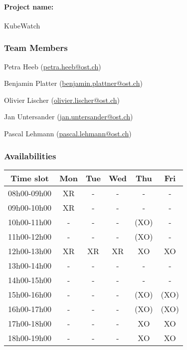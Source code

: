 

\paragraph{Project name:} KubeWatch

\subsubsection*{Team Members}

\begin{compactenum}
    \item Petra Heeb (\href{mailto:petra.heeb@ost.ch}{petra.heeb@ost.ch})
    \item Benjamin Platter (\href{mailto:benjamin.plattner@ost.ch}{benjamin.plattner@ost.ch})
    \item Olivier Lischer (\href{mailto:olivier.lischer@ost.ch}{olivier.lischer@ost.ch})
    \item Jan Untersander (\href{mailto:jan.untersander@ost.ch}{jan.untersander@ost.ch})
    \item Pascal Lehmann (\href{mailto:pascal.lehmann@ost.ch}{pascal.lehmann@ost.ch})
\end{compactenum}

\subsubsection*{Availabilities}


\begin{flushleft}
    \begin{tabular}{|c|c|c|c|c|c|}
        \hline
        Time slot   & Mon & Tue & Wed & Thu & Fri \\ \hline
        08h00-09h00 & XR  & -  & -  & -  & -  \\ \hline
        09h00-10h00 & XR  & -  & -  & -  & -  \\ \hline
        10h00-11h00 & -  & -  & -  & (XO)  & -  \\ \hline
        11h00-12h00 & -  & -  & -  & (XO)  & -  \\ \hline
        \rowcolor[HTML]{EFEFEF}
        12h00-13h00 & XR  & XR  & XR  & XO  & XO  \\ \hline
        13h00-14h00 & -  & -  & -  & -  & -  \\ \hline
        14h00-15h00 & -  & -  & -  & -  & -  \\ \hline
        15h00-16h00 & -  & -  & -  & (XO)  & (XO)  \\ \hline
        16h00-17h00 & -  & -  & -  & (XO)  & (XO)  \\ \hline
        \rowcolor[HTML]{EFEFEF}
        17h00-18h00 & -  & -  & -  & XO  & XO  \\ \hline
        \rowcolor[HTML]{EFEFEF}
        18h00-19h00 & -  & -  & -  & XO  & XO  \\ \hline
    \end{tabular}

\end{flushleft}



